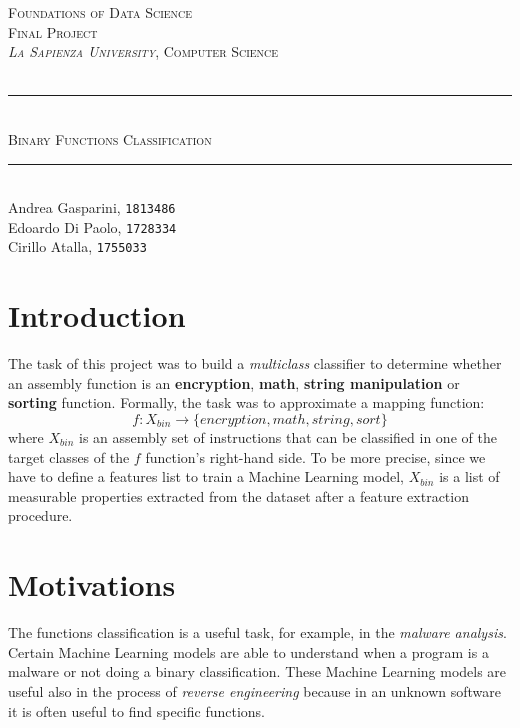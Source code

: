\documentclass[11pt]{article}
\date{A.Y. 2020-2021}
\makeatletter
\def\projectName{Binary Functions Classification}
\let\documentTitle\@title
\let\academicYear\@date
\makeatother
\begin{document}
\begin{titlepage}
	\centering
    \vspace*{0.5 cm}
    \textsc{\LARGE Foundations of Data Science}\\[0.2 cm]
    \textsc{\Large Final Project}\\[0.5 cm]
	\textsc{\textit{La Sapienza University}, Computer Science}\\[0.25 cm]
	\textsc{\academicYear}\\[0.75 cm]
	\rule{\linewidth}{0.2 mm} \\[0.4 cm]
	\textsc{\Huge \projectName}\\
	\rule{\linewidth}{0.2 mm} \\[0.4 cm]
	
	\large
	Andrea Gasparini, \texttt{1813486}\\[0.2 cm]
    Edoardo Di Paolo, \texttt{1728334}\\[0.2 cm]
    Cirillo Atalla, \texttt{1755033}\\[0.2 cm]
    
    \tableofcontents
\end{titlepage}

\newpage

\section{Introduction}
The task of this project was to build a \textit{multiclass} classifier to determine whether an assembly function is an \textbf{encryption}, \textbf{math}, \textbf{string manipulation} or \textbf{sorting} function. Formally, the task was to approximate a mapping function:
\[ f : X_{bin} \rightarrow \{encryption, math, string, sort\} \]
where $X_{bin}$ is an assembly set of instructions that can be classified in one of the target classes of the $f$ function's right-hand side. To be more precise, since we have to define a features list to train a Machine Learning model, $X_{bin}$ is a list of measurable properties extracted from the dataset after a feature extraction procedure.

\section{Motivations}
The functions classification is a useful task, for example, in the \textit{malware analysis}. Certain Machine Learning models are able to understand when a program is a malware or not doing a binary classification. These Machine Learning models are useful also in the process of \textit{reverse engineering} because in an unknown software it is often useful to find specific functions.
\end{document}

